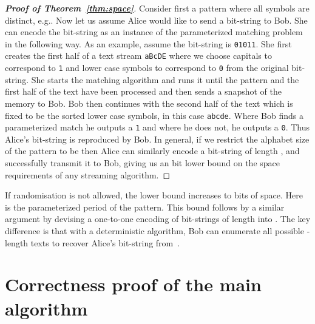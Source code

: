 \documentclass[11pt,a4paper]{article}
\theoremstyle{theorem}
\newcommand{\prooftheorem}[1]{\textbf{Proof of Theorem~\ref{#1}}}
\begin{document}
\begin{proof}[\prooftheorem{thm:space}]
Consider first a pattern where all symbols are distinct, e.g.\@ .  Now let us assume Alice would like to send a bit-string to Bob. She can encode the bit-string as an instance of the parameterized matching problem in the following way. As an example, assume the bit-string is \texttt{01011}. She first creates the first half of a text stream \texttt{aBcDE} where we choose capitals to correspond to \texttt{1} and lower case symbols to correspond to \texttt{0} from the original bit-string.  She starts the matching algorithm and runs it until the pattern and the first half of the text have been processed and then sends a snapshot of the memory to Bob.  Bob then continues with the second half of the text which is fixed to be the sorted lower case symbols, in this case \texttt{abcde}.  Where Bob finds a parameterized match he outputs a \texttt{1} and where he does not, he outputs a \texttt{0}.  Thus Alice's bit-string is reproduced by Bob. In general, if we restrict the alphabet size of the pattern to be  then Alice can similarly encode a bit-string of length , and successfully transmit it to Bob, giving us an  bit lower bound on the space requirements of any streaming algorithm.
\end{proof}

If randomisation is not allowed, the lower bound increases to  bits of space. Here  is the parameterized period of the pattern. This bound follows by a similar argument by devising a one-to-one encoding of bit-strings of length  into . The key difference is that with a deterministic algorithm, Bob can enumerate all possible -length texts to recover Alice's bit-string from~.




\section{Correctness proof of the main algorithm}\label{appendix:correctness}
\end{document}
